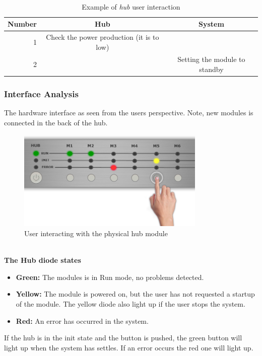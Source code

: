 		\\\begin{table}[h!]
					\begin{tabular}{| r | c | c |}
					\hline
					Number	& Hub				& System \\ \hline
					1		& Check the power production (it is to low)	& ~ \\ \hline
					2		& ~											& Setting the module to standby \\ \hline
					\end{tabular}
					\caption{Example of \textit{hub} user interaction}
				\end{table}
	\newpage	
	\subsubsection{Interface Analysis}
	The hardware interface as seen from the users perspective. Note, new modules is connected in the back of the hub.
		\begin{figure}[h!]		%
			\begin{centering}
				 \includegraphics[width=0.8\textwidth]{images/hub_user_interact.png}
				\caption{User interacting with the physical hub module}
		 	\end{centering}
		\end{figure}
		\\ \textbf{The Hub diode states}
		\begin{itemize}
			\item \textbf{Green: }The modules is in Run mode, no problems detected.
			\item \textbf{Yellow: }The module is powered on, but the user has not requested a startup of the module.
							The yellow diode also light up if the user stops the system.
			\item \textbf{Red: }An error has occurred in the system.
		\end{itemize}
		If the hub is in the init state and the button is pushed, the green button will light up when the system has settles. If an error occurs the red one will light up.
